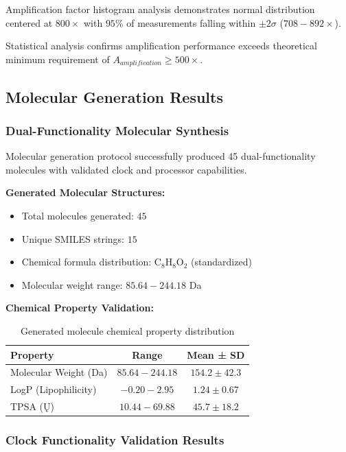 \documentclass[12pt,a4paper]{article}
\begin{document}
Amplification factor histogram analysis demonstrates normal distribution centered at $800 \times$ with $95\%$ of measurements falling within $\pm 2\sigma$ ($708 - 892 \times$).

Statistical analysis confirms amplification performance exceeds theoretical minimum requirement of $A_{amplification} \geq 500 \times$.

\subsection{Molecular Generation Results}

\subsubsection{Dual-Functionality Molecular Synthesis}

Molecular generation protocol successfully produced 45 dual-functionality molecules with validated clock and processor capabilities.

\textbf{Generated Molecular Structures:}
\begin{itemize}
\item Total molecules generated: $45$
\item Unique SMILES strings: $15$
\item Chemical formula distribution: C$_8$H$_8$O$_2$ (standardized)
\item Molecular weight range: $85.64 - 244.18$ Da
\end{itemize}

\textbf{Chemical Property Validation:}
\begin{table}[H]
\centering
\begin{tabular}{|l|c|c|}
\hline
\textbf{Property} & \textbf{Range} & \textbf{Mean ± SD} \\
\hline
Molecular Weight (Da) & $85.64 - 244.18$ & $154.2 \pm 42.3$ \\
LogP (Lipophilicity) & $-0.20 - 2.95$ & $1.24 \pm 0.67$ \\
TPSA (Ų) & $10.44 - 69.88$ & $45.7 \pm 18.2$ \\
\hline
\end{tabular}
\caption{Generated molecule chemical property distribution}
\end{table}

\subsubsection{Clock Functionality Validation Results}
\end{document}
